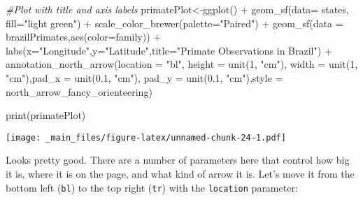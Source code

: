 \documentclass[
]{book}
\newenvironment{Shaded}{\begin{snugshade}}{\end{snugshade}}
\newcommand{\AttributeTok}[1]{\textcolor[rgb]{0.77,0.63,0.00}{#1}}
\newcommand{\CommentTok}[1]{\textcolor[rgb]{0.56,0.35,0.01}{\textit{#1}}}
\newcommand{\DecValTok}[1]{\textcolor[rgb]{0.00,0.00,0.81}{#1}}
\newcommand{\FloatTok}[1]{\textcolor[rgb]{0.00,0.00,0.81}{#1}}
\newcommand{\FunctionTok}[1]{\textcolor[rgb]{0.00,0.00,0.00}{#1}}
\newcommand{\NormalTok}[1]{#1}
\newcommand{\OtherTok}[1]{\textcolor[rgb]{0.56,0.35,0.01}{#1}}
\newcommand{\SpecialCharTok}[1]{\textcolor[rgb]{0.00,0.00,0.00}{#1}}
\newcommand{\StringTok}[1]{\textcolor[rgb]{0.31,0.60,0.02}{#1}}
\begin{document}
\begin{Shaded}
\begin{Highlighting}[]
\CommentTok{\#Plot with title and axis labels}
\NormalTok{primatePlot}\OtherTok{\textless{}{-}}\FunctionTok{ggplot}\NormalTok{() }\SpecialCharTok{+} 
  \FunctionTok{geom\_sf}\NormalTok{(}\AttributeTok{data=}\NormalTok{ states, }\AttributeTok{fill=}\StringTok{"light green"}\NormalTok{) }\SpecialCharTok{+}
  \FunctionTok{scale\_color\_brewer}\NormalTok{(}\AttributeTok{palette=}\StringTok{"Paired"}\NormalTok{) }\SpecialCharTok{+}
  \FunctionTok{geom\_sf}\NormalTok{(}\AttributeTok{data =}\NormalTok{ brazilPrimates,}\FunctionTok{aes}\NormalTok{(}\AttributeTok{color=}\NormalTok{family)) }\SpecialCharTok{+}
  \FunctionTok{labs}\NormalTok{(}\AttributeTok{x=}\StringTok{"Longitude"}\NormalTok{,}\AttributeTok{y=}\StringTok{"Latitude"}\NormalTok{,}\AttributeTok{title=}\StringTok{"Primate Observations in Brazil"}\NormalTok{)  }\SpecialCharTok{+}
   \FunctionTok{annotation\_north\_arrow}\NormalTok{(}\AttributeTok{location =} \StringTok{"bl"}\NormalTok{,  }\AttributeTok{height =} \FunctionTok{unit}\NormalTok{(}\DecValTok{1}\NormalTok{, }\StringTok{"cm"}\NormalTok{), }\AttributeTok{width =} \FunctionTok{unit}\NormalTok{(}\DecValTok{1}\NormalTok{, }\StringTok{"cm"}\NormalTok{),}\AttributeTok{pad\_x =} \FunctionTok{unit}\NormalTok{(}\FloatTok{0.1}\NormalTok{, }\StringTok{"cm"}\NormalTok{), }\AttributeTok{pad\_y =} \FunctionTok{unit}\NormalTok{(}\FloatTok{0.1}\NormalTok{, }\StringTok{"cm"}\NormalTok{),}\AttributeTok{style =}\NormalTok{ north\_arrow\_fancy\_orienteering)}


\FunctionTok{print}\NormalTok{(primatePlot)}
\end{Highlighting}
\end{Shaded}

\texttt{[image: \_main\_files/figure-latex/unnamed-chunk-24-1.pdf]}

Looks pretty good. There are a number of parameters here that control how big it is, where it is on the page, and what kind of arrow it is. Let's move it from the bottom left (\texttt{\textquotesingle{}bl\textquotesingle{}}) to the top right (\texttt{\textquotesingle{}tr\textquotesingle{}}) with the \texttt{location} parameter:
\end{document}
